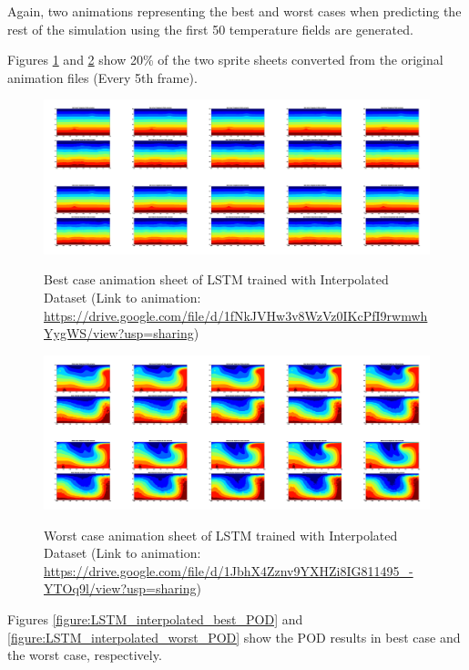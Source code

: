 Again, two animations representing the best and worst cases when predicting the rest of the simulation using the first 50 temperature fields are generated.

Figures \ref{figure:LSTM_interpolated_best_gif} and \ref{figure:LSTM_interpolated_worst_gif} show 20\% of the two sprite sheets converted from the original animation files (Every 5th frame).

\begin{figure}[H]
    \centering
    \caption{Best case animation sheet of LSTM trained with Interpolated Dataset (Link to animation: \url{https://drive.google.com/file/d/1fNkJVHw3v8WzVz0IKcPfI9rwmwhYygWS/view?usp=sharing})}
    \includegraphics[scale=0.10]{figures/mantle_convection_images/larger_dataset_interpolated/LSTM_Best_GIF_sheet.png}
     \label{figure:LSTM_interpolated_best_gif}
\end{figure}

\begin{figure}[H]
    \centering
    \caption{Worst case animation sheet of LSTM trained with Interpolated Dataset (Link to animation: 
    \url{https://drive.google.com/file/d/1JbhX4Zznv9YXHZi8IG811495_-YTOq9l/view?usp=sharing})}
    \includegraphics[scale=0.10]{figures/mantle_convection_images/larger_dataset_interpolated/LSTM_Worst_GIF_sheet.png}
    \label{figure:LSTM_interpolated_worst_gif}
\end{figure}

Figures \ref{figure:LSTM_interpolated_best_POD} and \ref{figure:LSTM_interpolated_worst_POD} show the POD results in best case and the worst case, respectively.

